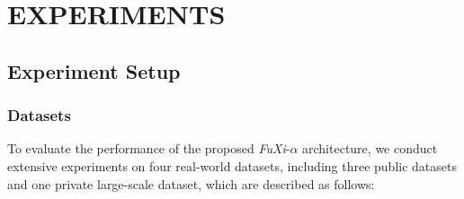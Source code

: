 \section{EXPERIMENTS}\label{experiment}


\subsection{Experiment Setup}\label{ExperimentSetup}

\subsubsection{Datasets}

To evaluate the performance of the proposed \textit{FuXi}-$\alpha$ architecture, we conduct extensive experiments on four real-world datasets, including three public datasets and one private large-scale dataset, which are described as follows:

